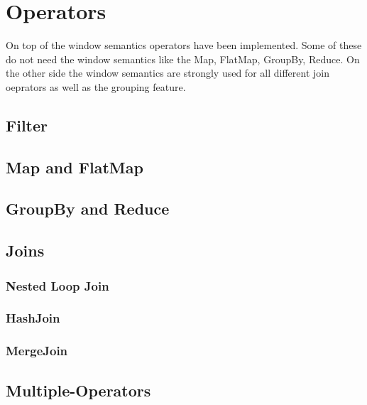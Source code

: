 \section{Operators}
\label{sect:operators}

On top of the window semantics operators have been implemented. Some of these do not need the window semantics like the Map, FlatMap,  GroupBy, Reduce. On the other side the window semantics are strongly used for all different join oeprators as well as the grouping feature.

\label{sect:operatorTypes}
\subsection{Filter}

\subsection{Map and FlatMap}

\subsection{GroupBy and Reduce}

\subsection{Joins}

\subsubsection{Nested Loop Join}

\subsubsection{HashJoin}

\subsubsection{MergeJoin}




\subsection{Multiple-Operators}
